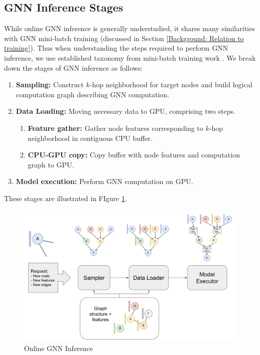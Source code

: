 \subsection{GNN Inference Stages}
While online GNN inference is generally understudied, it shares many similarities with GNN mini-batch training (discussed in Section \ref{Background: Relation to training}). Thus when understanding the steps required to perform GNN inference, we use established taxonomy from mini-batch training work \cite{PaGraph_2020}\cite{GNNLab_2022}\cite{P3_2021}. We break down the stages of GNN inference as follows:

\begin{enumerate}
    \item \textbf{Sampling:} Construct $k$-hop neighborhood for target nodes and build logical computation graph describing GNN computation.
    \item \textbf{Data Loading:} Moving necessary data to GPU, comprising two steps.
    \begin{enumerate}
        \item \textbf{Feature gather:} Gather node features corresponding to $k$-hop neighborhood in contiguous CPU buffer.
        \item \textbf{CPU-GPU copy:} Copy buffer with node features and computation graph to GPU.
    \end{enumerate}
    \item \textbf{Model execution:} Perform GNN computation on GPU.
\end{enumerate}
These stages are illustrated in FIgure \ref{Compute Visualization}.

\begin{figure}[h!!!]
    \centering
    \includegraphics[width=\textwidth]{figures/Compute example.png}
    
    \caption{Online GNN Inference}
    \label{Compute Visualization}
\end{figure}    


